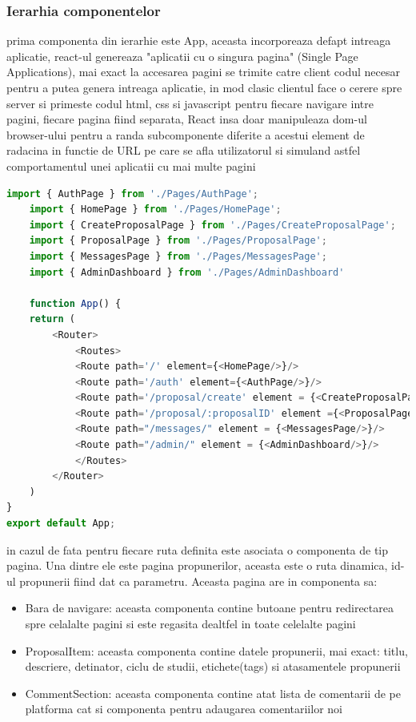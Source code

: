 \documentclass[12pt,a4paper,hidelinks]{report}
\theoremstyle{definition}
\theoremstyle{remark}
\begin{document}
\subsubsection{Ierarhia componentelor}
prima componenta din ierarhie este App, aceasta incorporeaza defapt intreaga aplicatie, react-ul genereaza "aplicatii cu o singura pagina" (Single Page Applications),
mai exact la accesarea pagini se trimite catre client codul necesar pentru a putea genera intreaga aplicatie, in mod clasic clientul
face o cerere spre server si primeste codul html, css si javascript pentru fiecare navigare intre pagini, fiecare pagina fiind separata, React insa
doar manipuleaza dom-ul browser-ului pentru a randa subcomponente diferite a acestui element de radacina in functie de URL pe care se afla utilizatorul si simuland 
astfel comportamentul unei aplicatii cu mai multe pagini
\begin{lstlisting}[language=Javascript]
    import { AuthPage } from './Pages/AuthPage';
    import { HomePage } from './Pages/HomePage';
    import { CreateProposalPage } from './Pages/CreateProposalPage';
    import { ProposalPage } from './Pages/ProposalPage';
    import { MessagesPage } from './Pages/MessagesPage';
    import { AdminDashboard } from './Pages/AdminDashboard'

    function App() {
    return (
        <Router>
            <Routes>
            <Route path='/' element={<HomePage/>}/>
            <Route path='/auth' element={<AuthPage/>}/>
            <Route path='/proposal/create' element = {<CreateProposalPage/>}/>
            <Route path='/proposal/:proposalID' element ={<ProposalPage/>}/>
            <Route path="/messages/" element = {<MessagesPage/>}/>
            <Route path="/admin/" element = {<AdminDashboard/>}/>
            </Routes>
        </Router>
    )
}
export default App;   
\end{lstlisting}
in cazul de fata pentru fiecare ruta definita este asociata o componenta de tip pagina.
Una dintre ele este pagina propunerilor, aceasta este o ruta dinamica, id-ul propunerii fiind dat ca parametru.
Aceasta pagina are in componenta sa:
\begin{itemize}
    \item Bara de navigare: aceasta componenta contine butoane pentru redirectarea spre celalalte pagini si este regasita dealtfel in toate celelalte pagini
    \item ProposalItem: aceasta componenta contine datele propunerii, mai exact: titlu, descriere, detinator, ciclu de studii, etichete(tags) si atasamentele propunerii
    \item CommentSection: aceasta componenta contine atat lista de comentarii de pe platforma cat si componenta pentru adaugarea comentariilor noi
\end{itemize}
\end{document}
